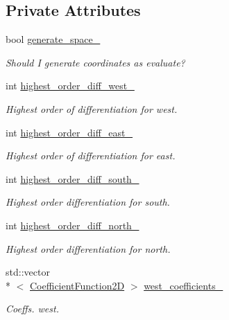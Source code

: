 \subsection*{Private Attributes}
\begin{DoxyCompactItemize}
\item 
bool \hyperlink{classmtk_1_1BCDescriptor2D_a3ef0bc7e9fbc16669099314dd34b170a}{generate\+\_\+space\+\_\+}
\begin{DoxyCompactList}\small\item\em Should I generate coordinates as evaluate? \end{DoxyCompactList}\item 
int \hyperlink{classmtk_1_1BCDescriptor2D_aa18ef62f8eda355e47f51bcb5dbe8fe7}{highest\+\_\+order\+\_\+diff\+\_\+west\+\_\+}
\begin{DoxyCompactList}\small\item\em Highest order of differentiation for west. \end{DoxyCompactList}\item 
int \hyperlink{classmtk_1_1BCDescriptor2D_aea5e539a10d5641bd605ebe583c14bc5}{highest\+\_\+order\+\_\+diff\+\_\+east\+\_\+}
\begin{DoxyCompactList}\small\item\em Highest order of differentiation for east. \end{DoxyCompactList}\item 
int \hyperlink{classmtk_1_1BCDescriptor2D_a1fb094e5e53ecfba32fe9fe56c051c47}{highest\+\_\+order\+\_\+diff\+\_\+south\+\_\+}
\begin{DoxyCompactList}\small\item\em Highest order differentiation for south. \end{DoxyCompactList}\item 
int \hyperlink{classmtk_1_1BCDescriptor2D_a6cdeefe70f5bef93196f34ab2949cad2}{highest\+\_\+order\+\_\+diff\+\_\+north\+\_\+}
\begin{DoxyCompactList}\small\item\em Highest order differentiation for north. \end{DoxyCompactList}\item 
std\+::vector\\*
$<$ \hyperlink{group__c07-mim__ops_gad9e1c0ace886b0029aefffa5f320e852}{Coefficient\+Function2\+D} $>$ \hyperlink{classmtk_1_1BCDescriptor2D_a7df71b43acc25c468683075cc7790bb2}{west\+\_\+coefficients\+\_\+}
\begin{DoxyCompactList}\small\item\em Coeffs. west. \end{DoxyCompactList}\item 

\end{DoxyCompactItemize}
